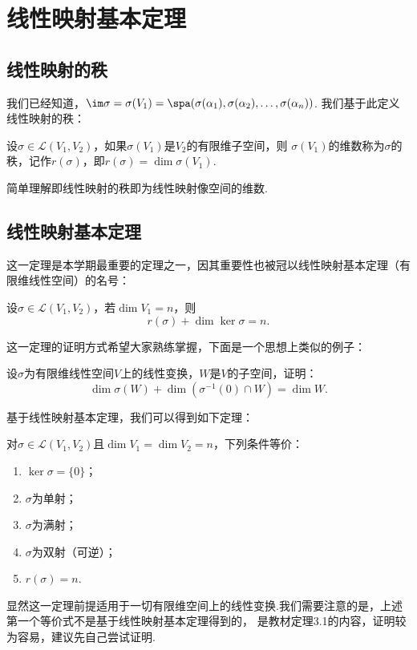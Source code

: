 \chapter{线性映射基本定理}

\section{线性映射的秩}
我们已经知道，$\im \sigma=\sigma(V_1)=\spa(\sigma(\alpha_1),\sigma(\alpha_2),\ldots,\sigma(\alpha_n))$.
我们基于此定义线性映射的秩：
\begin{definition}
    设$\sigma\in \mathcal{L}(V_1,V_2)$，如果$\sigma(V_1)$是$V_2$的有限维子空间，则
    $\sigma(V_1)$的维数称为$\sigma$的秩，记作$r(\sigma)$，即$r(\sigma)=\dim \sigma(V_1)$.
\end{definition}
简单理解即线性映射的秩即为线性映射像空间的维数.

\section{线性映射基本定理}
这一定理是本学期最重要的定理之一，因其重要性也被冠以线性映射基本定理（有限维线性空间）的名号：
\begin{theorem}
    设$\sigma \in \mathcal{L}(V_1,V_2)$，若$\dim V_1=n$，则
    \[r(\sigma)+\dim\ker\sigma=n.\]
\end{theorem}
这一定理的证明方式希望大家熟练掌握，下面是一个思想上类似的例子：
\begin{example}
    设$\sigma$为有限维线性空间$V$上的线性变换，$W$是$V$的子空间，证明：
    \[\dim\sigma(W)+\dim(\sigma^{-1}(0) \cap W)=\dim W.\]
\end{example}
基于线性映射基本定理，我们可以得到如下定理：
\begin{theorem}
    对$\sigma \in \mathcal{L}(V_1,V_2)$且$\dim V_1=\dim V_2=n$，下列条件等价：
    \begin{enumerate}
        \item $\ker \sigma=\{0\}$；
        \item $\sigma$为单射；
        \item $\sigma$为满射；
        \item $\sigma$为双射（可逆）；
        \item $r(\sigma)=n$.
    \end{enumerate}
\end{theorem}
显然这一定理前提适用于一切有限维空间上的线性变换.我们需要注意的是，上述第一个等价式不是基于线性映射基本定理得到的，
是教材定理3.1的内容，证明较为容易，建议先自己尝试证明.

